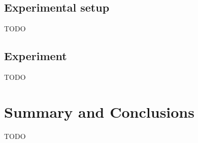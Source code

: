 \documentclass[a4paper,12pt]{article}
\begin{document}
\subsection{Experimental setup}
TODO

\subsection{Experiment}
TODO

\section{Summary and Conclusions}
\label{sec:summary}
TODO




\end{document}
